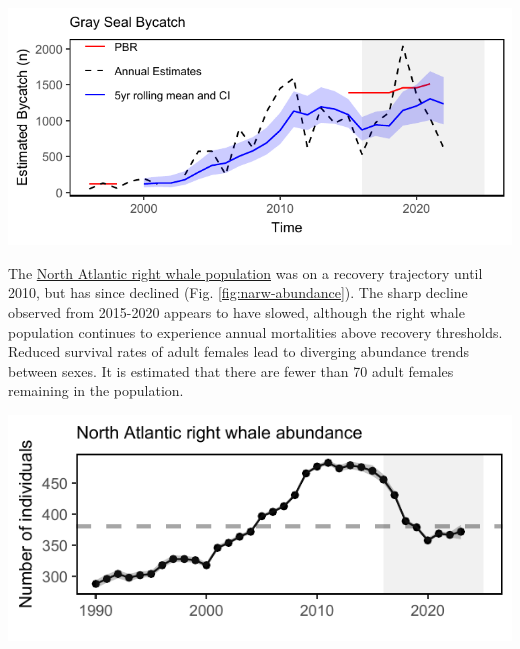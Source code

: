 \documentclass[
  10pt,
]{article}
\let\origfigure\figure
\let\endorigfigure\endfigure
\renewenvironment{figure}[1][2] {
    \expandafter\origfigure\expandafter[H]
} {
    \endorigfigure
}
\begin{document}
\begin{figure}

{\centering \includegraphics{midatlantic_files/figure-latex/grayseal-1} 

}

\caption{Gray Seal average bycatch estimate for gillnet fisheries (blue) and the potential biological removal (red).}\label{fig:grayseal}
\end{figure}

The \href{https://noaa-edab.github.io/catalog/narw.html}{North Atlantic right whale population} was on a recovery trajectory until 2010, but has since declined (Fig. \ref{fig:narw-abundance}). The sharp decline observed from 2015-2020 appears to have slowed, although the right whale population continues to experience annual mortalities above recovery thresholds. Reduced survival rates of adult females lead to diverging abundance trends between sexes. It is estimated that there are fewer than 70 adult females remaining in the population.

\begin{figure}

{\centering \includegraphics{midatlantic_files/figure-latex/narw-abundance-1} 

}

\caption{Estimated North Atlanic right whale abundance on the Northeast Shelf.}\label{fig:narw-abundance}
\end{figure}
\end{document}
